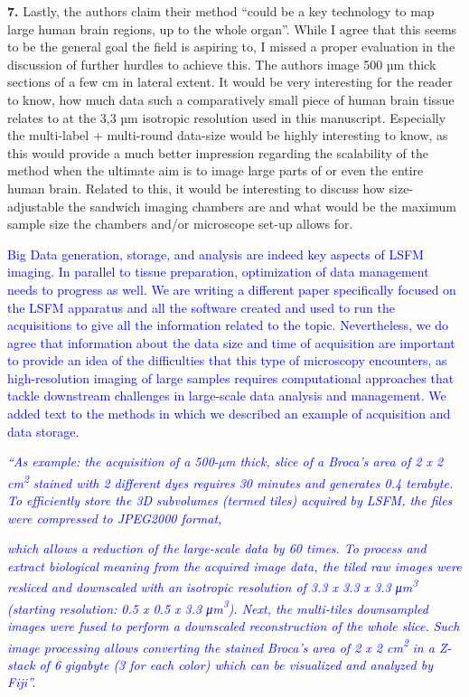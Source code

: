 \documentclass{article}
\newcommand{\reply}[1]{\textcolor{blue}{#1}}
\begin{document}
\noindent \textbf{7.} Lastly, the authors claim their method “could be a key technology to map large human brain regions, up to the whole organ”. While I agree that this seems to be the general goal the field is aspiring to, I missed a proper evaluation in the discussion of further hurdles to achieve this. The authors image 500 µm thick sections of a few cm in lateral extent. It would be very interesting for the reader to know, how much data such a comparatively small piece of human brain tissue relates to at the 3,3 µm isotropic resolution used in this manuscript. Especially the multi-label + multi-round data-size would be highly interesting to know, as this would provide a much better impression regarding the scalability of the method when the ultimate aim is to image large parts of or even the entire human brain. Related to this, it would be interesting to discuss how size-adjustable the sandwich imaging chambers are and what would be the maximum sample size the chambers and/or microscope set-up allows for.

\noindent \reply{Big Data generation, storage, and analysis are indeed key aspects of LSFM imaging. In parallel to} \reply{tissue preparation, optimization of data management needs to progress as well. We are writing a} \reply{different paper specifically focused on the LSFM apparatus and all the software created and used} \reply{to run the acquisitions to give all the information related to the topic. Nevertheless, we do agree} \reply{that information about the data size and time of acquisition are important to provide an idea of the} \reply{difficulties that this type of microscopy encounters, as high-resolution imaging of large samples} \reply{requires computational approaches that tackle downstream challenges in large-scale data analysis} \reply{and management. We added text to the methods in which we described an example of acquisition} \reply{and data storage.}

\noindent \reply{\emph{“As example: the acquisition of a 500-µm thick, slice of a Broca’s area of 2 x 2 cm}}\reply{\emph{\textsuperscript{2}}} \reply{\emph{stained with 2}} \reply{\emph{different dyes requires 30 minutes and generates 0.4 terabyte. To efficiently store the 3D}} \reply{\emph{subvolumes (termed tiles) acquired by LSFM, the files were compressed to JPEG2000 format,}}

\noindent {}\reply{\emph{which allows a reduction of the large-scale data by 60 times. To process and extract biological}} \reply{\emph{meaning from the acquired image data, the tiled raw images were resliced and downscaled with an}} \reply{\emph{isotropic resolution of 3.3 x 3.3 x 3.3 μm}}\reply{\emph{\textsuperscript{3}}} \reply{\emph{(starting resolution: 0.5 x 0.5 x 3.3 μm}}\reply{\emph{\textsuperscript{3}}}\reply{\emph{). Next, the multi-}}\reply{\emph{tiles downsampled images were fused to perform a downscaled reconstruction of the whole slice.}} \reply{\emph{Such image processing allows converting the stained Broca’s area of 2 x 2 cm}}\reply{\emph{\textsuperscript{2}}} \reply{\emph{in a Z-stack of 6}} \reply{\emph{gigabyte (3 for each color) which can be visualized and analyzed by Fiji”.}}
\end{document}
